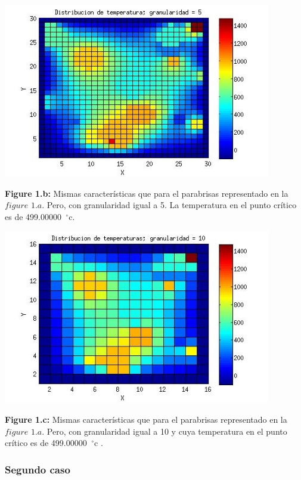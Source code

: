 \includegraphics[width=\textwidth,height=3.0in,keepaspectratio
]{140x140h5.jpg} \newline
\begin {flushleft}
\textbf{Figure 1.b:} Mismas características que para el parabrisas representado en la $figure$ $1.a$. Pero, con granularidad igual a 5. La temperatura en el punto crítico es de 499.00000\hspace{-1.5mm}$\phantom{a}^{\circ}$c.
\end{flushleft}


\includegraphics[width=\textwidth,height=3.0in,keepaspectratio
]{140x140h10.jpg} \newline
\begin {flushleft}
\textbf{Figure 1.c:} Mismas características que para el parabrisas representado en la $figure$ $1.a$. Pero, con granularidad igual a 10 y cuya temperatura en el punto crítico es de 499.00000\hspace{-1.5mm}$\phantom{a}^{\circ}$c .
\end{flushleft}


\subsubsection{Segundo caso}


